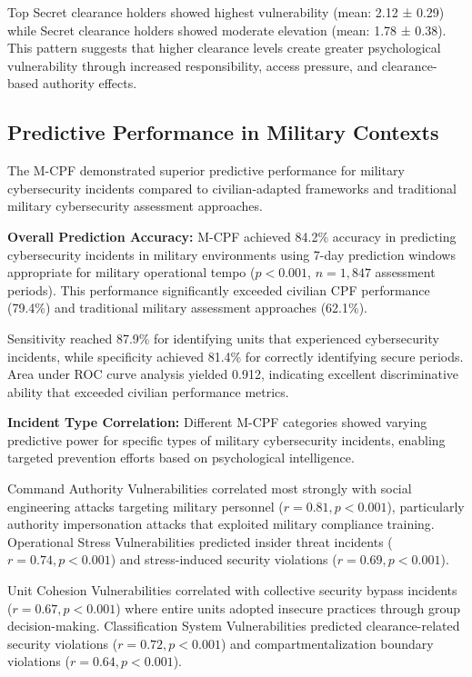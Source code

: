 \documentclass[10pt, twocolumn]{article}
\begin{document}
Top Secret clearance holders showed highest vulnerability (mean: 2.12 ± 0.29) while Secret clearance holders showed moderate elevation (mean: 1.78 ± 0.38). This pattern suggests that higher clearance levels create greater psychological vulnerability through increased responsibility, access pressure, and clearance-based authority effects.

\subsection{Predictive Performance in Military Contexts}

The M-CPF demonstrated superior predictive performance for military cybersecurity incidents compared to civilian-adapted frameworks and traditional military cybersecurity assessment approaches.

\textbf{Overall Prediction Accuracy:} M-CPF achieved 84.2\% accuracy in predicting cybersecurity incidents in military environments using 7-day prediction windows appropriate for military operational tempo ($p < 0.001$, $n = 1,847$ assessment periods). This performance significantly exceeded civilian CPF performance (79.4\%) and traditional military assessment approaches (62.1\%).

Sensitivity reached 87.9\% for identifying units that experienced cybersecurity incidents, while specificity achieved 81.4\% for correctly identifying secure periods. Area under ROC curve analysis yielded 0.912, indicating excellent discriminative ability that exceeded civilian performance metrics.

\textbf{Incident Type Correlation:} Different M-CPF categories showed varying predictive power for specific types of military cybersecurity incidents, enabling targeted prevention efforts based on psychological intelligence.

Command Authority Vulnerabilities correlated most strongly with social engineering attacks targeting military personnel ($r = 0.81, p < 0.001$), particularly authority impersonation attacks that exploited military compliance training. Operational Stress Vulnerabilities predicted insider threat incidents ($r = 0.74, p < 0.001$) and stress-induced security violations ($r = 0.69, p < 0.001$).

Unit Cohesion Vulnerabilities correlated with collective security bypass incidents ($r = 0.67, p < 0.001$) where entire units adopted insecure practices through group decision-making. Classification System Vulnerabilities predicted clearance-related security violations ($r = 0.72, p < 0.001$) and compartmentalization boundary violations ($r = 0.64, p < 0.001$).
\end{document}
